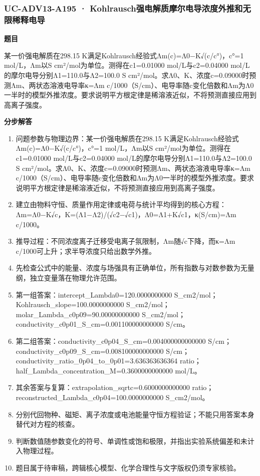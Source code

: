 \documentclass[UTF8,11pt,a4paper]{ctexart}
\begin{document}
\subsubsection*{UC-ADV13-A195 · Kohlrausch强电解质摩尔电导浓度外推和无限稀释电导}
\noindent\textbf{题目}\par
某一价强电解质在298.15 K满足Kohlrausch经验式Λm(c)=Λ0−K√(c/c°)，c°=1 mol/L，Λm以S cm²/mol为单位。测得在c1=0.01000 mol/L与c2=0.04000 mol/L的摩尔电导分别Λ1=110.0与Λ2=100.0 S cm²/mol。求Λ0、K、浓度c=0.09000时预测Λm、两状态溶液电导率κ=Λm c/1000（S/cm）、电导率随c变化倍数和Λm为Λ0一半时的模型外推浓度。要求说明平方根定律是稀溶液近似，不将预测直接应用到高离子强度。\par
\medskip\noindent\textbf{分步解答}
\begin{enumerate}
\item 问题参数与物理边界：某一价强电解质在298.15 K满足Kohlrausch经验式Λm(c)=Λ0−K√(c/c°)，c°=1 mol/L，Λm以S cm²/mol为单位。测得在c1=0.01000 mol/L与c2=0.04000 mol/L的摩尔电导分别Λ1=110.0与Λ2=100.0 S cm²/mol。求Λ0、K、浓度c=0.09000时预测Λm、两状态溶液电导率κ=Λm c/1000（S/cm）、电导率随c变化倍数和Λm为Λ0一半时的模型外推浓度。要求说明平方根定律是稀溶液近似，不将预测直接应用到高离子强度。
\item 建立由物料守恒、质量作用定律或电荷与统计平均得到的核心方程：Λm=Λ0−K√c，K=(Λ1−Λ2)/(√c2−√c1)，Λ0=Λ1+K√c1，κ(S/cm)=Λm c/1000。
\item 推导过程：不同浓度离子迁移受电离子氛限制，Λm随√c下降，而κ=Λm c/1000可上升；求半导浓度只给出数学外推。
\item 先检查公式中的能量、浓度与场强具有正确单位，所有指数与对数参数为无量纲，独立变量落在物理允许范围。
\item 第一组答案：intercept\_Lambda0=120.0000000000 S\_cm2/mol；Kohlrausch\_slope=100.0000000000 S\_cm2/mol；molar\_Lambda\_c0p09=90.00000000000 S\_cm2/mol；conductivity\_c0p01\_S\_cm=0.001100000000000 S/cm。
\item 第二组答案：conductivity\_c0p04\_S\_cm=0.004000000000000 S/cm；conductivity\_c0p09\_S\_cm=0.008100000000000 S/cm；conductivity\_ratio\_0p04\_to\_0p01=3.636363636364 ratio；half\_Lambda\_concentration\_M=0.3600000000000 mol/L。
\item 其余答案与复算：extrapolation\_sqrtc=0.6000000000000 ratio；reconstructed\_Lambda\_c0p04=100.0000000000 S\_cm2/mol。
\item 分别代回物种、磁矩、离子浓度或电池能量守恒方程验证；不能只用答案本身替代对方程的核查。
\item 判断数值随参数变化的符号、单调性或饱和极限，并指出实验系统偏差和未计入物理过程。
\item 题目属于待审稿，跨辑核心模型、化学合理性与文字版权仍须专家核验。
\end{enumerate}
\end{document}
